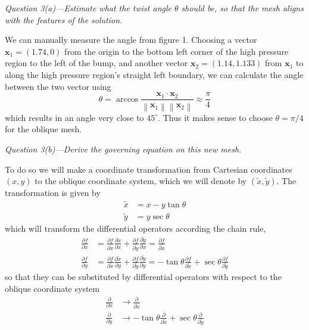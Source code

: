 \documentclass[11pt]{article}
\begin{document}
\begin{tcolorbox}
  \textit{Question 3(a)---Estimate what the twist angle $\theta$ should be, so that the mesh aligns with the features of the solution.}
\end{tcolorbox}
We can manually measure the angle from figure 1. Choosing a vector $\mathbf{x}_1 = (1.74, 0)$ from the origin to the bottom left corner of the high pressure region to the left of the bump, and another vector $\mathbf{x}_2 = (1.14, 1.133)$ from $\mathbf{x}_1$ to along the high pressure region's straight left boundary, we can calculate the angle between the two vector using
\begin{equation*}
  \theta = \arccos \frac{\mathbf{x}_1 \cdot \mathbf{x}_2}{\left\lVert\mathbf{x}_1\right\rVert \left\lVert\mathbf{x}_2\right\rVert} \approx \frac{\pi}{4}
\end{equation*}
which results in an angle very close to $45^\circ$. Thus it makes sense to choose $\theta = \pi/4$ for the oblique mesh. \\

\begin{tcolorbox}
  \textit{Question 3(b)---Derive the governing equation on this new mesh.}
\end{tcolorbox}
To do so we will make a coordinate transformation from Cartesian coordinates $(x,y)$ to the oblique coordinate system, which we will denote by $(\tilde{x}, \tilde{y})$. The transformation is given by
\begin{subequations}
\begin{align}
  \tilde{x} &= x - y\tan\theta \\
  \tilde{y} &= y\sec\theta
\end{align}
\end{subequations}
which will transform the differential operators according the chain rule,
\begin{align*}
  \frac{\partial f}{\partial x} &= \frac{\partial f}{\partial \tilde{x}} \frac{\partial \tilde{x}}{\partial x}
  + \frac{\partial f}{\partial \tilde{y}} \frac{\partial \tilde{y}}{\partial x} = \frac{\partial f}{\partial \tilde{x}} \\
  \frac{\partial f}{\partial y} &= \frac{\partial f}{\partial \tilde{x}} \frac{\partial \tilde{x}}{\partial y}
  + \frac{\partial f}{\partial \tilde{y}} \frac{\partial \tilde{y}}{\partial y} = -\tan\theta\frac{\partial f}{\partial \tilde{x}} + \sec\theta \frac{\partial f}{\partial \tilde{y}}
\end{align*}
so that they can be substituted by differential operators with respect to the oblique coordinate system
\begin{subequations}
\begin{align}
  \frac{\partial}{\partial x} &\rightarrow \frac{\partial}{\partial \tilde{x}} \label{eq:NewDOx} \\
  \frac{\partial}{\partial y} &\rightarrow -\tan\theta\frac{\partial}{\partial \tilde{x}} + \sec\theta\frac{\partial}{\partial \tilde{y}} \label{eq:NewDOy}
\end{align}
\end{subequations}
\end{document}
